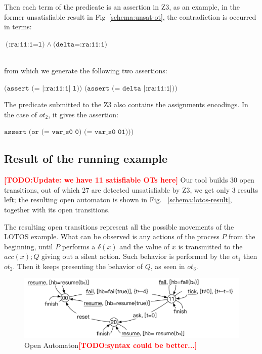\documentclass{lncs/llncs}
\newcommand{\TODO}[1]{\textcolor{red}{\textbf{[TODO:#1]}}}
\newcommand{\OTvar}{\texttt}
\newcommand{\OTland}{\;\land\ }
\begin{document}
\noindent Then each term of the
predicate is an assertion in Z3, as an example, in the former
unsatisfiable result in Fig~\ref{schema:unsat-ot}, the contradiction is occurred in terms: \\
\centerline{$\OTvar{(:ra:11:1=l)} \OTland \OTvar{(delta=:ra:11:1)}$}\\
from which we generate the following two assertions:\\
\centerline{$\OTvar{(assert\ (=\ |:ra:11:1|\ l))\ \ \ (assert\ (=\ delta\ |:ra:11:1|))}$}

\noindent The predicate submitted to the Z3 also contains the
assignments encodings.
In the case of $ot_2$, it
gives the assertion:\\
\centerline{$\OTvar{assert (or (= var\_s0 0) (= var\_s0 01)))}$}


\subsection{Result of the running example}
\label{section:full-result}

\TODO{Update: we have 11 satisfiable OTs here}
Our tool builds 30 open
transitions, out of which 27 are detected unsatisfiable by Z3, we
get only 3 results left; the resulting open automaton is shown in
Fig. ~\ref{schema:lotos-result}, together with its open transitions.

The resulting open transitions represent all the
possible movements of the LOTOS example.
What can be observed is any actions of the process $P$ from the beginning, until $P$ performs a $\delta(x)$ and the value of
$x$ is transmitted to the $acc(x);Q$ giving out a silent action. Such behavior is performed by the $ot_1$ then $ot_2$. 
Then it keeps presenting the behavior of $Q$, as seen in $ot_3$. 

\begin{figure}[t]
   \centerline{\includegraphics[width=12cm]{XFIG/BIPresult-ArchFailureTimerMax}}
   \caption{Open Automaton\TODO{syntax could be better...}}  \label{schema:resultOA}
 \end{figure}
\end{document}
